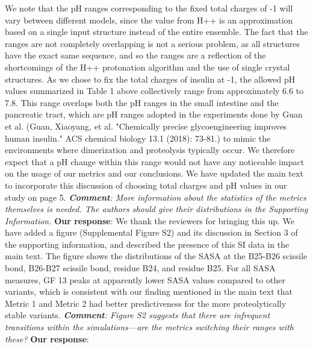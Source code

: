 \documentclass[9pt]{elife}
\begin{document}
We note that the pH ranges corresponding to the fixed total charges of -1 will vary between different models, since the value from H++ is an approximation based on a single input structure instead of the entire ensemble. The fact that the ranges are not completely overlapping is not a serious problem, as all structures have the exact same sequence, and so the ranges are a reflection of the shortcomings of the H++ protonation algorithm and the use of single crystal structures.  As we chose to fix the total charges of insulin at -1, the allowed pH values summarized in Table 1 above collectively range from approximately 6.6 to 7.8. This range overlaps both the pH ranges in the small intestine and the pancreatic tract, which are pH ranges adopted in the experiments done by Guan et al. (Guan, Xiaoyang, et al. "Chemically precise glycoengineering improves human insulin." ACS chemical biology 13.1 (2018): 73-81.) to mimic the environments where dimerization and proteolysis typically occur. We therefore expect that a pH change within this range would not have any noticeable impact on the usage of our metrics and our conclusions. We have updated the main text to incorporate this discussion of choosing total charges and pH values in our study on page 5.
\newline
\newline 
\indent
\textit{\textbf{Comment}:
More information about the statistics of the metrics themselves is needed. The authors should give their distributions in the Supporting Information.}
\newline
\noindent 
{\bf Our response}: 
We thank the reviewers for bringing this up. We have added a figure (Supplemental Figure S2) and its discussion in Section 3 of the supporting information, and described the presence of this SI data in the main text. The figure shows the distributions of the SASA at the B25-B26 scissile bond, B26-B27 scissile bond, residue B24, and residue B25. For all SASA measures, GF 13 peaks at apparently lower SASA values compared to other variants, which is consistent with our finding mentioned in the main text that Metric 1 and Metric 2 had better predictiveness for the more proteolytically stable variants. 
\newline
\newline
\indent
\textit{\textbf{Comment}:
Figure S2 suggests that there are infrequent transitions within the simulations---are the metrics switching their ranges with these?}
\newline
\indent 
{\bf Our response}: 
\end{document}
